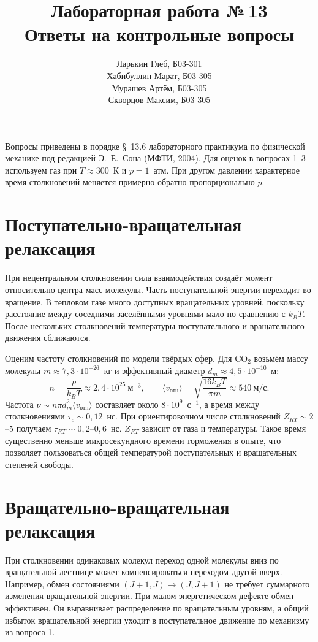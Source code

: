 \documentclass[12pt,a4paper]{article}
\title{Лабораторная работа №\,13\\Ответы на контрольные вопросы}
\author{Ларькин Глеб, Б03-301 \\
Хабибуллин Марат, Б03-305 \\
Мурашев Артём, Б03-305 \\
Скворцов Максим, Б03-305}
\date{}
\newcommand{\COO}{\mathrm{CO_2}}
\begin{document}
\maketitle

Вопросы приведены в порядке §~13.6 лабораторного практикума
по физической механике под редакцией Э.~Е.~Сона (МФТИ, 2004).
Для оценок в вопросах 1--3 используем газ при $T\approx300$~К и
$p=1$~атм. При другом давлении характерное время столкновений
меняется примерно обратно пропорционально $p$.

\section{Поступательно-вращательная релаксация}

При нецентральном столкновении сила взаимодействия создаёт момент
относительно центра масс молекулы. Часть поступательной энергии
переходит во вращение. В тепловом газе много доступных вращательных
уровней, поскольку расстояние между соседними заселёнными уровнями
мало по сравнению с $k_BT$. После нескольких столкновений температуры
поступательного и вращательного движения сближаются.

Оценим частоту столкновений по модели твёрдых сфер. Для $\COO$ возьмём
массу молекулы $m\approx7{,}3\cdot10^{-26}$~кг и эффективный
диаметр $d_m\approx4{,}5\cdot10^{-10}$~м:
\[
 n=\frac{p}{k_BT}\approx2{,}4\cdot 10^{25}~\text{м}^{-3},\qquad
 \langle v_{\text{отн}}\rangle=\sqrt{\frac{16k_BT}{\pi m}}
       \approx 540~\text{м/с}.
\]
Частота $\nu\sim n\pi d_m^2\langle v_{\text{отн}}\rangle$
составляет около $8\cdot10^9$~с$^{-1}$, а время между столкновениями
$\tau_c\sim0{,}12$~нс. При ориентировочном числе столкновений
$Z_{RT}\sim2$--$5$ получаем $\tau_{RT}\sim0{,}2$--$0{,}6$~нс.
$Z_{RT}$ зависит от газа и температуры. Такое время существенно
меньше микросекундного времени торможения в опыте, что позволяет
пользоваться общей температурой поступательных и вращательных степеней
свободы.

\section{Вращательно-вращательная релаксация}

При столкновении одинаковых молекул переход одной молекулы вниз по
вращательной лестнице может компенсироваться переходом другой вверх.
Например, обмен состояниями $(J+1,J)\to(J,J+1)$ не требует суммарного
изменения вращательной энергии. При малом энергетическом дефекте
обмен эффективен. Он выравнивает распределение по вращательным уровням,
а общий избыток вращательной энергии уходит в поступательное движение
по механизму из вопроса 1.
\end{document}
